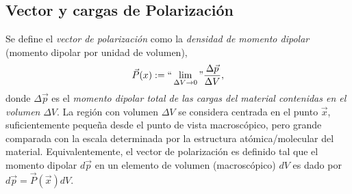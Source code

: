 \subsection{Vector y cargas de Polarización}

Se define el \textit{vector de polarización} como la \textit{densidad de
momento dipolar} (momento dipolar por unidad de volumen),
\begin{equation}\label{defP}
\vec{P}(x):= ``\lim_{\Delta V\to 0}" \frac{\Delta\vec{p}}{\Delta V},
\end{equation}
donde $\Delta\vec{p}$ es el \textit{momento dipolar total de las cargas del material contenidas en el volumen} $\Delta V$. La región con volumen $\Delta V$ se considera centrada en el punto $\vec{x}$, suficientemente pequeña desde el punto de vista macroscópico, pero grande comparada con la escala  determinada por la estructura atómica/molecular del material. Equivalentemente, el vector de polarización es definido tal que el momento dipolar $d\vec{p}$ en un elemento de volumen (macroscópico) $dV$ es dado por $d\vec{p}=\vec{P}(\vec{x})dV$.

